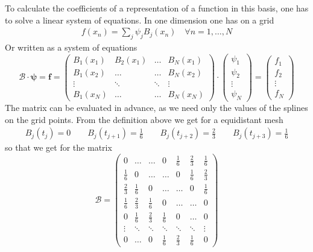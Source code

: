 \documentclass[12pt]{report}
\begin{document}
To calculate the coefficients of a representation of a function in
this basis, one has to solve a linear system of equations. In one
dimension one has on a grid
\begin{eqnarray*}
  f(x_n) = \sum_j \psi_j B_j(x_n)\quad\forall n=1,\ldots,N
\end{eqnarray*}
Or written as a system of equations
\begin{displaymath}
  \mathcal{B}\cdot\mathbf{\psi}=\mathbf{f}=
  \left(
    \begin{array}{ccccc}
      B_1(x_1) & B_2(x_1) & \ldots & B_N(x_1)\\
      B_1(x_2) & \ldots & \ldots & B_N(x_2)\\
      \vdots & \ddots & \ddots & \vdots\\
      B_1(x_N) & \ldots & \ldots & B_N(x_N)
    \end{array}
  \right)\cdot\left(
    \begin{array}{c}
      \psi_1\\\psi_2\\\vdots\\\psi_N
    \end{array}
  \right)
  =\left(
    \begin{array}{c}
      f_1\\f_2\\\vdots\\f_N
    \end{array}
  \right)
\end{displaymath}
The matrix can be evaluated in advance, as we need only the values of
the splines on the grid points. From the definition above we get for a
equidistant mesh
\begin{eqnarray*}
  B_j(t_j) = 0\qquad B_j(t_{j+1})=\frac{1}{6}
  \qquad B_j(t_{j+2}) = \frac{2}{3}\qquad
  B_j(t_{j+3}) = \frac{1}{6}
\end{eqnarray*}
so that we get for the matrix
\begin{displaymath}
  \mathcal{B}=\left(
    \begin{array}{ccccccc}
      0 & \ldots & \ldots & 0 & \frac{1}{6} & \frac{2}{3} & \frac{1}{6}\\
      \frac{1}{6} & 0 & \ldots & \ldots & 0 & \frac{1}{6} & \frac{2}{3} \\
      \frac{2}{3} & \frac{1}{6} & 0 &  \ldots &\ldots & 0 & \frac{1}{6} \\
      \frac{1}{6} & \frac{2}{3} & \frac{1}{6} & 0 & \ldots & \ldots & 0 \\
      0 & \frac{1}{6} & \frac{2}{3} & \frac{1}{6} & 0 & \ldots & 0\\
      \vdots & \ddots & \ddots & \ddots & \ddots & \ddots & \vdots\\
      0 & \ldots & 0 & \frac{1}{6} & \frac{2}{3} & \frac{1}{6} & 0 
    \end{array}
  \right)
\end{displaymath}
\end{document}
